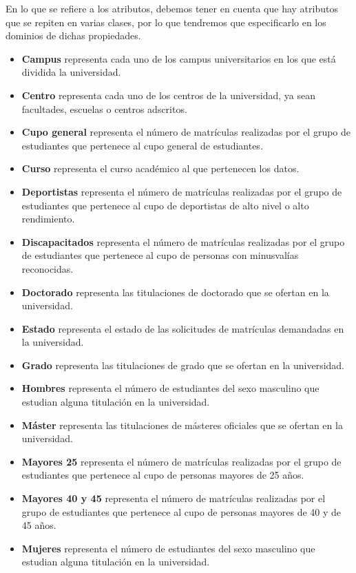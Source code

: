 En lo que se refiere a los atributos, debemos tener en cuenta que hay atributos que se repiten en varias clases, por lo que tendremos que especificarlo en los dominios de dichas propiedades.

\begin{itemize}
	\item \textbf{Campus} representa cada uno de los campus universitarios en los que está dividida la universidad.
	\item \textbf{Centro} representa cada uno de los centros de la universidad, ya sean facultades, escuelas o centros adscritos.
	\item \textbf{Cupo general} representa el número de matrículas realizadas por el grupo de estudiantes que pertenece al cupo general de estudiantes.
	\item \textbf{Curso} representa el curso académico al que pertenecen los datos.
	\item \textbf{Deportistas} representa el número de matrículas realizadas por el grupo de estudiantes que pertenece al cupo de deportistas de alto nivel o alto rendimiento.
	\item \textbf{Discapacitados} representa el número de matrículas realizadas por el grupo de estudiantes que pertenece al cupo de personas con minusvalías reconocidas.
	\item \textbf{Doctorado} representa las titulaciones de doctorado que se ofertan en la universidad.
	\item \textbf{Estado} representa el estado de las solicitudes de matrículas demandadas en la universidad.
	\item \textbf{Grado} representa las titulaciones de grado que se ofertan en la universidad.
	\item \textbf{Hombres} representa el número de estudiantes del sexo masculino que estudian alguna titulación en la universidad.
	\item \textbf{Máster} representa las titulaciones de másteres oficiales que se ofertan en la universidad.
	\item \textbf{Mayores 25} representa el número de matrículas realizadas por el grupo de estudiantes que pertenece al cupo de personas mayores de 25 años.
	\item \textbf{Mayores 40 y 45 } representa el número de matrículas realizadas por el grupo de estudiantes que pertenece al cupo de personas mayores de 40 y de 45 años.
	\item \textbf{Mujeres} representa el número de estudiantes del sexo masculino que estudian alguna titulación en la universidad.

\end{itemize}
